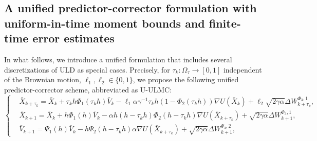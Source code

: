 \documentclass[12pt]{article}
\numberwithin{equation}{section}
\begin{document}




\subsection{A unified predictor-corrector formulation with uniform-in-time moment bounds and finite-time error estimates}\label{subsec:uni-process-uni-bounds}
In what follows, we introduce a unified formulation that includes several discretizations of ULD as special cases. 
Precisely, for $\tau_k \colon \Omega_\tau \to [0,1]$ independent of the Brownian motion, $\ell_1,\ell_2\in\{0,1\}$, we propose the following unified predictor-corrector scheme, abbreviated as U-ULMC: 
\begin{equation}
\label{eq:uni-process}
\left\{
\begin{aligned}
&\bar{X}_{k+\tau_k}
=
\bar{X}_k
+ 
\tau_k h\Phi_1(\tau_kh)\bar{V}_k
-
\ell_1 \alpha \gamma^{-1}
\tau_k h 
(1-\Phi_2(\tau_k h))
\nabla U (\bar{X}_k)
+
\ell_2\sqrt{2\gamma \alpha}
\Delta W_{k+\tau_k}^{\Phi_3,1}, \\
&\bar{X}_{k+1}
=
\bar{X}_k
+
h\Phi_1(h)\bar{V}_k
-
\alpha 
h(h-\tau_k h)\Phi_2(h-\tau_kh)\nabla U(\bar{X}_{k+\tau_k})
+
\sqrt{2\gamma \alpha}
\Delta W_{k+1}^{\Phi_3,1},\\
&\bar{V}_{k+1}
=
\Psi_1(h)\bar{V}_k
-
h\Psi_2(h-\tau_k h)\alpha
\nabla U(\bar{X}_{k+\tau_k})
+
\sqrt{2\gamma\alpha}
\Delta W_{k+1}^{\Psi_3,2},
\end{aligned}
\right.
\end{equation}
\end{document}
